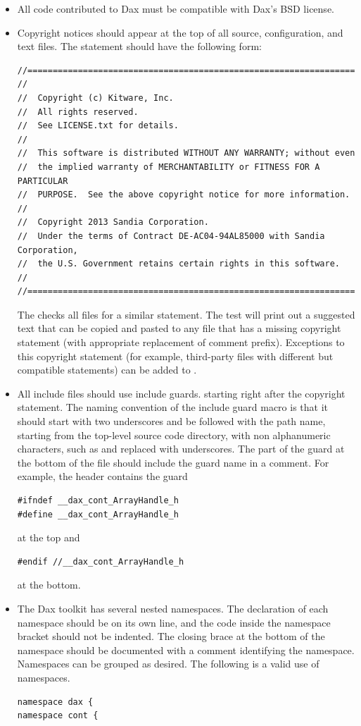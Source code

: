 \begin{itemize}
\item All code contributed to Dax must be compatible with Dax's BSD
  license.
\item Copyright notices should appear at the top of all source,
  configuration, and text files. The statement should have the following
  form:
\small\begin{verbatim}
//==========================================================================
//
//  Copyright (c) Kitware, Inc.
//  All rights reserved.
//  See LICENSE.txt for details.
//
//  This software is distributed WITHOUT ANY WARRANTY; without even
//  the implied warranty of MERCHANTABILITY or FITNESS FOR A PARTICULAR
//  PURPOSE.  See the above copyright notice for more information.
//
//  Copyright 2013 Sandia Corporation.
//  Under the terms of Contract DE-AC04-94AL85000 with Sandia Corporation,
//  the U.S. Government retains certain rights in this software.
//
//==========================================================================
\end{verbatim}
  The  checks all files for a similar
  statement. The test will print out a suggested text that can be copied
  and pasted to any file that has a missing copyright statement (with
  appropriate replacement of comment prefix). Exceptions to this copyright
  statement (for example, third-party files with different but compatible
  statements) can be added to .
\item All include files should use include guards. starting right after the
  copyright statement. The naming convention of the include guard macro is
  that it should start with two underscores and be followed with the
  path name, starting from the top-level source code directory, with non
  alphanumeric characters, such as \textcode{/} and  replaced
  with underscores. The  part of the guard at the bottom
  of the file should include the guard name in a comment. For example, the
   header contains the guard
  \begin{verbatim}
#ifndef __dax_cont_ArrayHandle_h
#define __dax_cont_ArrayHandle_h
\end{verbatim}
  at the top and
  \begin{verbatim}
#endif //__dax_cont_ArrayHandle_h
\end{verbatim}
  at the bottom.
\item The Dax toolkit has several nested namespaces. The declaration of
  each namespace should be on its own line, and the code inside the
  namespace bracket should not be indented. The closing brace at the bottom
  of the namespace should be documented with a comment identifying the
  namespace. Namespaces can be grouped as desired. The following is a valid
  use of namespaces.
  \begin{verbatim}
namespace dax {
namespace cont {


\end{verbatim}
\end{itemize}
